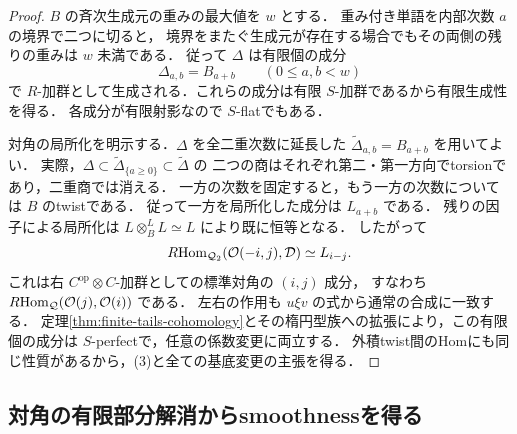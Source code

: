 \begin{proof}
$B$ の斉次生成元の重みの最大値を $w$ とする．
重み付き単語を内部次数 $a$ の境界で二つに切ると，
境界をまたぐ生成元が存在する場合でもその両側の残りの重みは $w$ 未満である．
従って $\Delta$ は有限個の成分
\[
 \Delta_{a,b}=B_{a+b}\qquad(0\le a,b<w)
\]
で $R$-加群として生成される．これらの成分は有限 $S$-加群であるから有限生成性を得る．
各成分が有限射影なので $S$-flatでもある．

対角の局所化を明示する．$\Delta$ を全二重次数に延長した
$\widetilde\Delta_{a,b}=B_{a+b}$ を用いてよい．
実際，$\Delta\subset\widetilde\Delta_{\{a\ge0\}}\subset\widetilde\Delta$ の
二つの商はそれぞれ第二・第一方向でtorsionであり，二重商では消える．
一方の次数を固定すると，もう一方の次数については $B$ のtwistである．
従って一方を局所化した成分は $L_{a+b}$ である．
残りの因子による局所化は $L\otimes_B^LL\simeq L$ により既に恒等となる．
したがって
\[
 R\!\operatorname{Hom}_{\mathcal Q_2}
       (\mathcal O(-i,j),\mathcal D)\simeq L_{i-j}.
\]
これは右 $C^{\mathrm{op}}\otimes C$-加群としての標準対角の $(i,j)$ 成分，
すなわち $R\!\operatorname{Hom}_{\mathcal Q}(\mathcal O(j),\mathcal O(i))$ である．
左右の作用も $u\xi v$ の式から通常の合成に一致する．
定理\ref{thm:finite-tails-cohomology}とその楕円型族への拡張により，この有限個の成分は
$S$-perfectで，任意の係数変更に両立する．
外積twist間のHomにも同じ性質があるから，(3)と全ての基底変更の主張を得る．
\end{proof}

\subsection{対角の有限部分解消からsmoothnessを得る}

